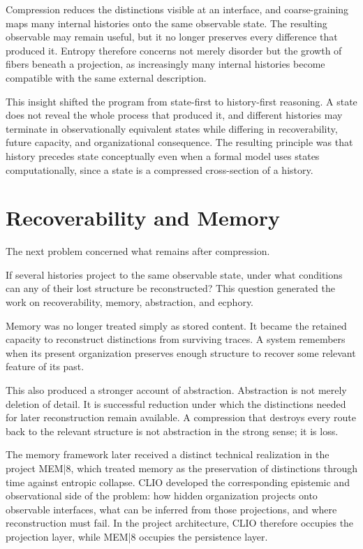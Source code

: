 \documentclass[11pt,oneside]{book}
\numberwithin{equation}{chapter}
\theoremstyle{definition}
\theoremstyle{plain}
\begin{document}
Compression reduces the distinctions visible at an interface, and coarse-graining maps many internal histories onto the same observable state. The resulting observable may remain useful, but it no longer preserves every difference that produced it. Entropy therefore concerns not merely disorder but the growth of fibers beneath a projection, as increasingly many internal histories become compatible with the same external description.

This insight shifted the program from state-first to history-first reasoning. A state does not reveal the whole process that produced it, and different histories may terminate in observationally equivalent states while differing in recoverability, future capacity, and organizational consequence. The resulting principle was that history precedes state conceptually even when a formal model uses states computationally, since a state is a compressed cross-section of a history.

\section{Recoverability and Memory}

The next problem concerned what remains after compression.

If several histories project to the same observable state, under what
conditions can any of their lost structure be reconstructed? This question
generated the work on recoverability, memory, abstraction, and ecphory.

Memory was no longer treated simply as stored content. It became the
retained capacity to reconstruct distinctions from surviving traces. A
system remembers when its present organization preserves enough structure
to recover some relevant feature of its past.

This also produced a stronger account of abstraction. Abstraction is not
merely deletion of detail. It is successful reduction under which the
distinctions needed for later reconstruction remain available. A
compression that destroys every route back to the relevant structure is not
abstraction in the strong sense; it is loss.

The memory framework later received a distinct technical realization in the
project MEM|8, which treated memory as the preservation of distinctions
through time against entropic collapse. CLIO developed the corresponding
epistemic and observational side of the problem: how hidden organization
projects onto observable interfaces, what can be inferred from those
projections, and where reconstruction must fail. In the project
architecture, CLIO therefore occupies the projection layer, while MEM|8
occupies the persistence layer.
\end{document}
